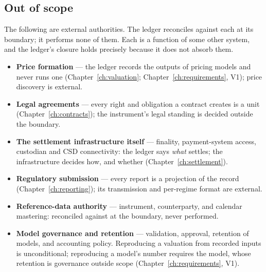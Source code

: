\subsection{Out of scope}

The following are external authorities. The ledger reconciles against each at its boundary;
it performs none of them. Each is a function of some other system, and the ledger's
closure holds precisely because it does not absorb them.

\begin{itemize}[leftmargin=*, itemsep=2.5pt]
\item \textbf{Price formation} --- the ledger records the outputs of pricing models and
  never runs one (Chapter~\ref{ch:valuation}; Chapter~\ref{ch:requirements}, V1); price
  discovery is external.
\item \textbf{Legal agreements} --- every right and obligation a contract creates is a
  unit (Chapter~\ref{ch:contracts}); the instrument's legal standing is decided outside
  the boundary.
\item \textbf{The settlement infrastructure itself} --- finality, payment-system access,
  custodian and CSD connectivity: the ledger says \emph{what} settles; the infrastructure
  decides how, and whether (Chapter~\ref{ch:settlement}).
\item \textbf{Regulatory submission} --- every report is a projection of the record
  (Chapter~\ref{ch:reporting}); its transmission and per-regime format are external.
\item \textbf{Reference-data authority} --- instrument, counterparty, and calendar
  mastering: reconciled against at the boundary, never performed.
\item \textbf{Model governance and retention} --- validation, approval, retention of
  models, and accounting policy. Reproducing a valuation from recorded inputs is
  unconditional; reproducing a model's number requires the model, whose retention is
  governance outside scope (Chapter~\ref{ch:requirements}, V1).
\end{itemize}

